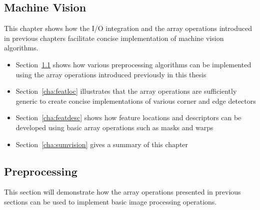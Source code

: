 \documentclass[12pt,a4paper,oneside,openright]{book}
\newcommand{\sct}[1]{Section~\ref{cha:#1}}
\begin{document}
\begin{CJK}{UTF8}{}
\chapter{Machine Vision}\label{cha:vision}
This chapter shows how the \ac{I}/\ac{O} integration and the array operations introduced in previous chapters facilitate concise implementation of machine vision algorithms.
\begin{itemize}
\item \sct{prepros} shows how various preprocessing algorithms can be implemented using the array operations introduced previously in this thesis
\item \sct{featloc} illustrates that the array operations are sufficiently generic to create concise implementations of various corner and edge detectors
\item \sct{featdesc} shows how feature locations and descriptors can be developed using basic array operations such as masks and warps
\item \sct{sumvision} gives a summary of this chapter
\end{itemize}
 
\section{Preprocessing}\label{cha:prepros}
This section will demonstrate how the array operations presented in previous sections can be used to implement basic image processing operations.


\end{CJK}
\end{document}

